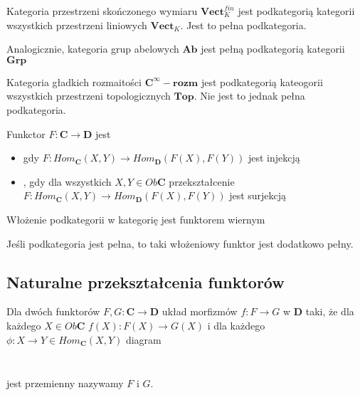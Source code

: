 \begin{example}
\item Kategoria przestrzeni skończonego wymiaru $\mathbf{Vect}_K^{fin}$ jest podkategorią kategorii wszystkich przestrzeni liniowych $\mathbf{Vect}_K$. Jest to pełna podkategoria.
\item Analogicznie, kategoria grup abelowych $\mathbf{Ab}$ jest pełną podkategorią kategorii $\mathbf{Grp}$
\item Kategoria gładkich rozmaitości $\mathbf{C^\infty-rozm}$ jest podkategorią kateogorii wszystkich przestrzeni topologicznych $\mathbf{Top}$. Nie jest to jednak pełna podkategoria.
\end{example}

\begin{definition}
  Funkctor $F:\mathbf{C}\to\mathbf{D}$ jest
  \begin{itemize}
    \item {} gdy $F:Hom_{\mathbf{C}}(X,Y)\to Hom_{\mathbf{D}}(F(X),F(Y))$ jest injekcją
    \item {}, gdy dla wszystkich $X,Y\in Ob\mathbf{C}$ przekształcenie $F:Hom_{\mathbf{C}}(X,Y)\to Hom_{\mathbf{D}}(F(X),F(Y))$ jest surjekcją
  \end{itemize}
\end{definition}

\begin{example}
\item Włożenie podkategorii w kategorię jest funktorem wiernym
\item Jeśli podkategoria jest pełna, to taki włożeniowy funktor jest dodatkowo pełny.
\end{example}

\subsection{Naturalne przekształcenia funktorów}

\begin{definition}
  Dla dwóch funktorów $F, G:\mathbf{C}\to\mathbf{D}$ układ morfizmów $f:F\to G$ w $\mathbf{D}$ taki, że dla każdego $X\in Ob\mathbf{C}$ $f(X):F(X)\to G(X)$ i dla każdego $\phi:X\to Y\in Hom_{\mathbf{C}}(X, Y)$ diagram

  $ $

  \begin{center}
  \end{center}

  $ $

  jest przemienny nazywamy  $F$ i $G$.
\end{definition}

